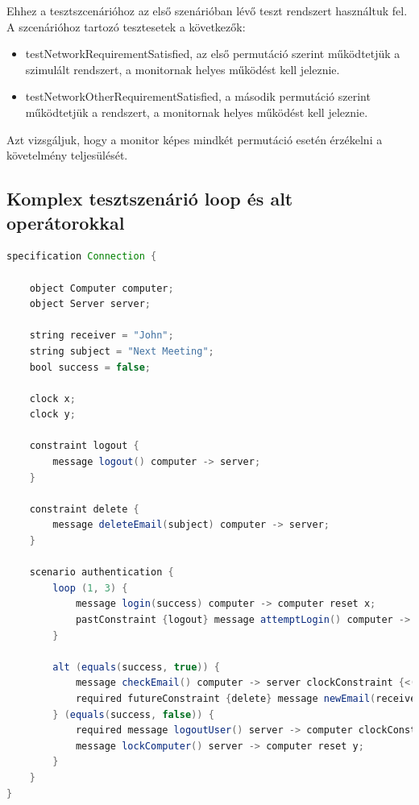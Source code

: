 Ehhez a tesztszcenárióhoz az első szenárióban lévő teszt rendszert használtuk fel.
A szcenárióhoz tartozó tesztesetek a következők:

\begin{itemize}
    \item testNetworkRequirementSatisfied, az első permutáció szerint működtetjük a szimulált rendszert, a monitornak helyes működést kell jeleznie.
    \item testNetworkOtherRequirementSatisfied, a második permutáció szerint működtetjük a rendszert, a monitornak helyes működést kell jeleznie.
\end{itemize}

Azt vizsgáljuk, hogy a monitor képes mindkét permutáció esetén érzékelni a követelmény teljesülését.

\subsection{Komplex tesztszenárió loop és alt operátorokkal}

\begin{lstlisting}[language=java, frame=single, float=ht!, caption={Komplex teszteset szcenáriója.},captionpos=b,label=test_complex_scenario]
specification Connection {

    object Computer computer;
    object Server server;

    string receiver = "John";
    string subject = "Next Meeting";
    bool success = false;

    clock x;
    clock y;

    constraint logout {
        message logout() computer -> server;
    }

    constraint delete {
        message deleteEmail(subject) computer -> server;
    }

    scenario authentication {
        loop (1, 3) {
            message login(success) computer -> computer reset x;
            pastConstraint {logout} message attemptLogin() computer -> server reset y;
        }

        alt (equals(success, true)) {
            message checkEmail() computer -> server clockConstraint {<(x, 2)};
            required futureConstraint {delete} message newEmail(receiver, subject) computer -> server reset x;
        } (equals(success, false)) {
            required message logoutUser() server -> computer clockConstraint {>(y, 3)};
            message lockComputer() server -> computer reset y;
        }
    }
}
\end{lstlisting}

